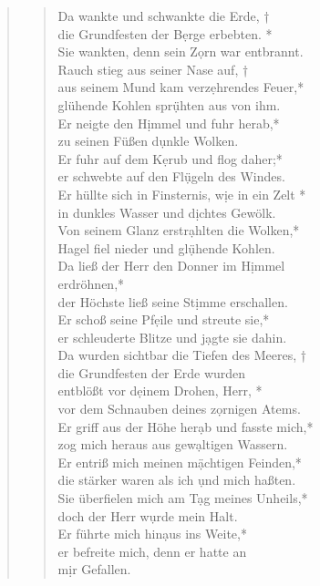 



\begin{quote}
\begin{verse}








\smallskip
Da wankte und schwankte die Erde, †\\ \vin
die Grundfesten der B\d erge erbebten. *\\ \vin
Sie wankten, denn sein Z\d orn war entbrannt.\\

Rauch stieg aus seiner Nase auf, †\\
aus seinem Mund kam verz\d ehrendes Feuer,*\\ 
glühende Kohlen spr\d ühten aus von ihm.\\ \vin
Er neigte den H\d immel und fuhr herab,*\\ \vin
zu seinen Füßen d\d unkle Wolken.\\
Er fuhr auf dem K\d erub und flog daher;*\\
er schwebte auf den Fl\d ügeln des Windes.\\ \vin
Er hüllte sich in Finsternis, w\d ie in ein Zelt *\\ \vin
in dunkles Wasser und d\d ichtes Gewölk.\\
Von seinem Glanz erstr\d ahlten die Wolken,*\\
Hagel fiel nieder und gl\d ühende Kohlen.\\ \vin
Da ließ der Herr den Donner im H\d immel\\ \vin  erdröhnen,*\\ \vin
der Höchste ließ seine St\d imme erschallen.\\ 
Er schoß seine Pf\d eile und streute sie,*\\ 
er schleuderte Blitze und j\d agte sie dahin.\\ \vin
Da wurden sichtbar die Tiefen des Meeres, †\\ \vin
die Grundfesten der Erde wurden \\ \vin entblößt vor  d\d einem Drohen, Herr, *\\ \vin
vor dem Schnauben deines z\d ornigen Atems.\\

Er griff aus der Höhe her\d ab und fasste mich,*\\
zog mich heraus aus gew\d altigen Wassern.\\ \vin
Er entriß mich meinen m\d ächtigen Feinden,*\\ \vin
die stärker waren als ich \d und mich haßten.\\
Sie überfielen mich am T\d ag meines Unheils,*\\
doch der Herr w\d urde mein Halt.\\ \vin
Er führte mich hin\d aus ins Weite,*\\ \vin
er befreite mich, denn er hatte an\\ \vin  m\d ir Gefallen.\\


\end{verse}
\end{quote}
